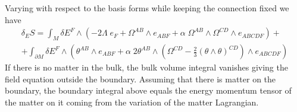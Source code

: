 \documentclass[a4paper,a4paper]{article}
\begin{document}
Varying with respect to the basis forms while keeping the connection fixed we have
\begin{eqnarray} \label{var}
\delta_E S=\int_M \delta E^F \wedge (-2 \Lambda \; e_F + \Omega^{AB} \wedge e_{ABF} + \alpha \;
\Omega^{AB} \wedge \Omega^{CD} \wedge e_{ABCDF})+ \\ 
+ \int_{\partial M} \delta E^F \wedge (\theta^{AB} \wedge e_{ABF}+\alpha \; 2 \theta^{AB} \wedge 
( \Omega^{CD} - \frac{2}{3} (\theta \wedge \theta)^{CD}) \wedge e_{ABCDF}) \nonumber
\end{eqnarray}
If there is no matter in the bulk, the bulk volume integral vanishes giving the field equation outside the
boundary. Assuming that there is matter on the boundary, the boundary integral above equals the energy momentum
tensor of the matter on it coming from the variation of the matter Lagrangian. 
\end{document}
